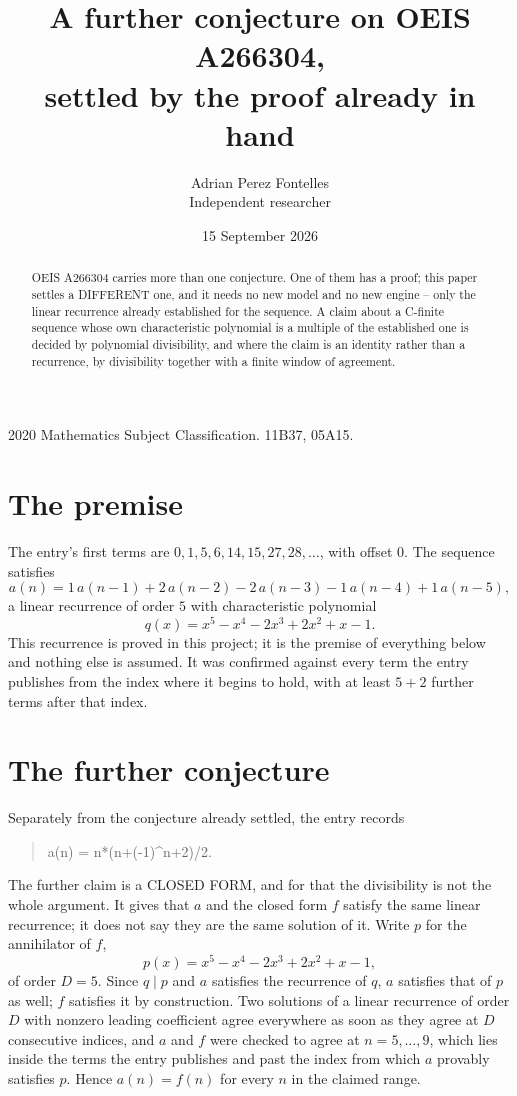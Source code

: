 \documentclass[11pt,a4paper]{article}
\title{A further conjecture on OEIS A266304,\\ \large settled by the proof already in hand}
\author{Adrian Perez Fontelles\\ \small Independent researcher}
\date{15 September 2026}
\theoremstyle{plain}
\theoremstyle{definition}
\begin{document}
\maketitle

\begin{abstract}
OEIS A266304 carries more than one conjecture. One of them has a proof; this paper settles a
DIFFERENT one, and it needs no new model and no new engine -- only the linear recurrence already
established for the sequence. A claim about a C-finite sequence whose own characteristic
polynomial is a multiple of the established one is decided by polynomial divisibility, and where
the claim is an identity rather than a recurrence, by divisibility together with a finite window
of agreement.
\end{abstract}

\noindent\small 2020 Mathematics Subject Classification. 11B37, 05A15.\normalsize

\section{The premise}

The entry's first terms are $0, 1, 5, 6, 14, 15, 27, 28,\dots$, with offset $0$. The sequence satisfies
\[
  a(n)=1\,a(n-1) + 2\,a(n-2) - 2\,a(n-3) - 1\,a(n-4) + 1\,a(n-5) ,
\]
a linear recurrence of order $5$ with characteristic polynomial
\[
  q(x)=x^{5} - x^{4} - 2 x^{3} + 2 x^{2} + x - 1 .
\]
This recurrence is proved in this project; it is the premise of everything below and nothing else is assumed.
It was confirmed against every term the entry publishes from the index where it begins to hold,
with at least $5+2$ further terms after that index.

\section{The further conjecture}

Separately from the conjecture already settled, the entry records

\begin{quote}\raggedright a(n) = n*(n+(-1)\^{}n+2)/2.\end{quote}

The further claim is a CLOSED FORM, and for that the divisibility is not the whole argument. It
gives that $a$ and the closed form $f$ satisfy the same linear recurrence; it does not say they
are the same solution of it. Write $p$ for the annihilator of $f$,
\[
  p(x)=x^{5} - x^{4} - 2 x^{3} + 2 x^{2} + x - 1 ,
\]
of order $D=5$. Since $q\mid p$ and $a$ satisfies the recurrence of $q$, $a$ satisfies that of
$p$ as well; $f$ satisfies it by construction. Two solutions of a linear recurrence of order $D$
with nonzero leading coefficient agree everywhere as soon as they agree at $D$ consecutive
indices, and $a$ and $f$ were checked to agree at $n=5,\dots,9$,
which lies inside the terms the entry publishes and past the index from which $a$ provably
satisfies $p$. Hence $a(n)=f(n)$ for every $n$ in the claimed range.
\end{document}
